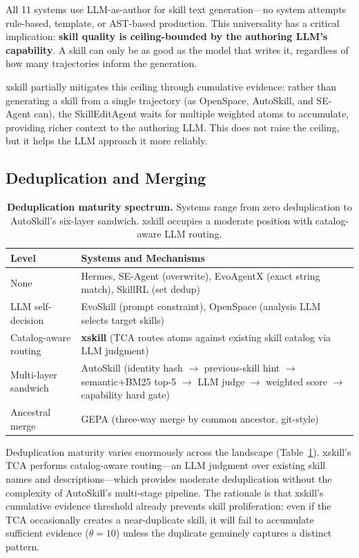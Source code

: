 \documentclass{article}
\begin{document}
All 11 systems use LLM-as-author for skill text generation---no system attempts rule-based, template, or AST-based production. This universality has a critical implication: \textbf{skill quality is ceiling-bounded by the authoring LLM's capability}. A skill can only be as good as the model that writes it, regardless of how many trajectories inform the generation.

xskill partially mitigates this ceiling through cumulative evidence: rather than generating a skill from a single trajectory (as OpenSpace, AutoSkill, and SE-Agent can), the SkillEditAgent waits for multiple weighted atoms to accumulate, providing richer context to the authoring LLM. This does not raise the ceiling, but it helps the LLM approach it more reliably.

\subsection{Deduplication and Merging}

\begin{table}[t]
\centering
\caption{\textbf{Deduplication maturity spectrum.} Systems range from zero deduplication to AutoSkill's six-layer sandwich. xskill occupies a moderate position with catalog-aware LLM routing.}
\label{tab:dedup}
\small
\begin{tabular}{@{}lp{6.5cm}@{}}
\toprule
\textbf{Level} & \textbf{Systems and Mechanisms} \\
\midrule
None & Hermes, SE-Agent (overwrite), EvoAgentX (exact string match), SkillRL (set dedup) \\
LLM self-decision & EvoSkill (prompt constraint), OpenSpace (analysis LLM selects target skills) \\
Catalog-aware routing & \textbf{xskill} (TCA routes atoms against existing skill catalog via LLM judgment) \\
Multi-layer sandwich & AutoSkill (identity hash $\to$ previous-skill hint $\to$ semantic+BM25 top-5 $\to$ LLM judge $\to$ weighted score $\to$ capability hard gate) \\
Ancestral merge & GEPA (three-way merge by common ancestor, git-style) \\
\bottomrule
\end{tabular}
\end{table}

Deduplication maturity varies enormously across the landscape (Table~\ref{tab:dedup}). xskill's TCA performs catalog-aware routing---an LLM judgment over existing skill names and descriptions---which provides moderate deduplication without the complexity of AutoSkill's multi-stage pipeline. The rationale is that xskill's cumulative evidence threshold already prevents skill proliferation: even if the TCA occasionally creates a near-duplicate skill, it will fail to accumulate sufficient evidence ($\theta = 10$) unless the duplicate genuinely captures a distinct pattern.
\end{document}
